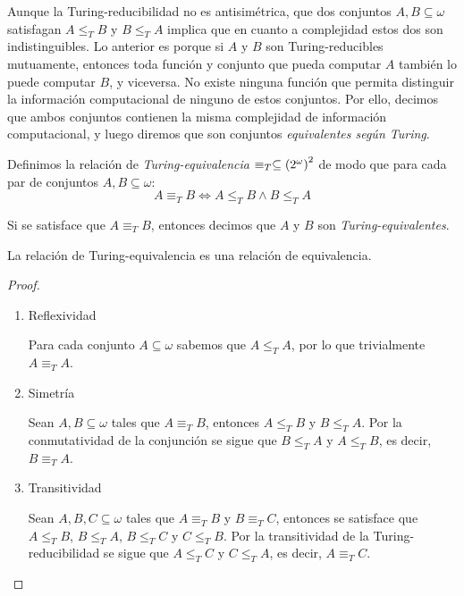 \begin{agregado}
Aunque la Turing-reducibilidad no es antisimétrica, que dos conjuntos $A, B\subseteq\omega$ satisfagan $A\leq_{T} B$ y $B\leq_{T} A$ implica que en cuanto a complejidad estos dos son indistinguibles. Lo anterior es porque si $A$ y $B$ son Turing-reducibles mutuamente, entonces toda función y conjunto que pueda computar $A$ también lo puede computar $B$, y viceversa. No existe ninguna función que permita distinguir la información computacional de ninguno de estos conjuntos. Por ello, decimos que ambos conjuntos contienen la misma complejidad de información computacional, y luego diremos que son conjuntos \emph{equivalentes según Turing}.

\begin{definition}
	\label{def: turing_equivalencia}
	Definimos la relación de \emph{Turing-equivalencia} $\equiv_{T}\subseteq\pa*{\CPOTENCIA{\omega}}^{2}$ de modo que para cada par de conjuntos $A, B\subseteq\omega$:
	\[
		A\equiv_{T} B\iff A\leq_{T} B\land B\leq_{T} A
	\]

	Si se satisface que $A\equiv_{T} B$, entonces decimos que $A$ y $B$ son \emph{Turing-equivalentes}.
\end{definition}

\begin{theorem}
	La relación de Turing-equivalencia es una relación de equivalencia.
\end{theorem}

\begin{proof}
	\begin{enumerate}
		\item Reflexividad

		Para cada conjunto $A\subseteq\omega$ sabemos que $A\leq_{T} A$, por lo que trivialmente $A\equiv_{T} A$.

		\item Simetría

		Sean $A, B\subseteq\omega$ tales que $A\equiv_{T} B$, entonces $A\leq_{T} B$ y $B\leq_{T} A$. Por la conmutatividad de la conjunción se sigue que $B\leq_{T} A$ y $A\leq_{T} B$, es decir, $B\equiv_{T} A$.

		\item Transitividad

		Sean $A, B, C\subseteq\omega$ tales que $A\equiv_{T} B$ y $B\equiv_{T} C$, entonces se satisface que $A\leq_{T} B$, $B\leq_{T} A$, $B\leq_{T} C$ y $C\leq_{T} B$. Por la transitividad de la Turing-reducibilidad se sigue que $A\leq_{T} C$ y $C\leq_{T} A$, es decir, $A\equiv_{T} C$.
	\end{enumerate}
\end{proof}


\end{agregado}
